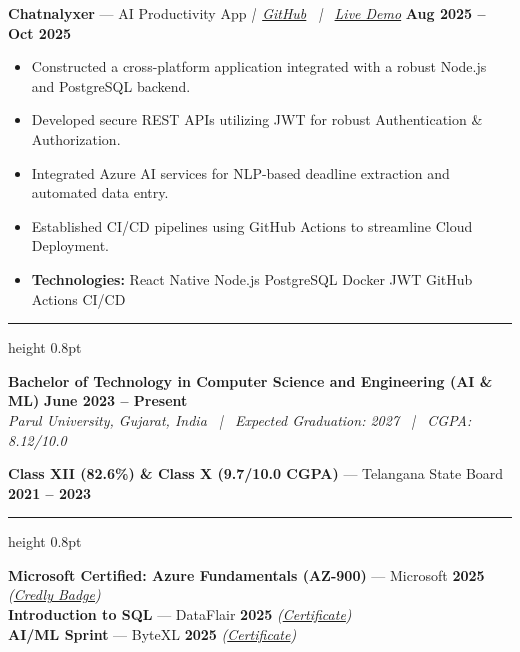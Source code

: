 \documentclass[10pt,a4paper]{article}
\newcommand{\resumesection}[1]{%
  \vspace{5pt}%
  \noindent{\large\textbf{#1}}\par
  \vspace{2pt}%
  \hrule height 0.8pt
  \vspace{4pt}%
}
\begin{document}
\vspace{4pt}

\noindent\textbf{Chatnalyxer} --- AI Productivity App \textit{|\ \href{https://github.com/Rahul-pamula/chatnalyxer.git}{GitHub} \ | \ \href{http://chatnalyxer.app/}{Live Demo}} \hfill \textbf{Aug 2025 -- Oct 2025}
\begin{itemize}[leftmargin=1.2em, topsep=1pt, itemsep=0pt, parsep=0pt]
    \item Constructed a cross-platform application integrated with a robust Node.js and PostgreSQL backend.
    \item Developed secure REST APIs utilizing JWT for robust Authentication \& Authorization.
    \item Integrated Azure AI services for NLP-based deadline extraction and automated data entry.
    \item Established CI/CD pipelines using GitHub Actions to streamline Cloud Deployment.
    \item \textbf{Technologies:} React Native \textbullet{} Node.js \textbullet{} PostgreSQL \textbullet{} Docker \textbullet{} JWT \textbullet{} GitHub Actions \textbullet{} CI/CD
\end{itemize}

\resumesection{EDUCATION}

\noindent\textbf{Bachelor of Technology in Computer Science and Engineering (AI \& ML)} \hfill \textbf{June 2023 -- Present} \\
\textit{Parul University, Gujarat, India \ | \ Expected Graduation: 2027 \ | \ CGPA: 8.12/10.0}

\vspace{4pt}

\noindent\textbf{Class XII (82.6\%) \& Class X (9.7/10.0 CGPA)} --- Telangana State Board \hfill \textbf{2021 -- 2023}

\resumesection{CERTIFICATIONS}

\noindent\textbf{Microsoft Certified: Azure Fundamentals (AZ-900)} --- Microsoft \hfill \textbf{2025} \textit{(\href{https://www.credly.com/badges/cb01588f-556d-448d-84f3-aebeef100485/public_url}{Credly Badge})} \\
\noindent\textbf{Introduction to SQL} --- DataFlair \hfill \textbf{2025} \textit{(\href{https://drive.google.com/file/d/1oosWCwBwj4BE8eseplqIj-2Cx2dp42X3/view?usp=sharing}{Certificate})} \\
\noindent\textbf{AI/ML Sprint} --- ByteXL \hfill \textbf{2025} \textit{(\href{https://drive.google.com/file/d/1Didyx_p9tVhQ_uAG6CP7Sf4VfBXdAbES/view?usp=sharing}{Certificate})}
\end{document}
